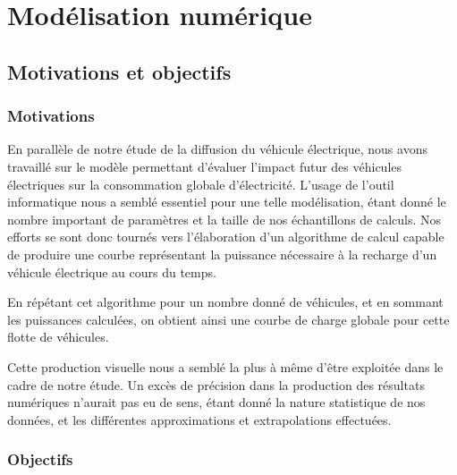 \lstset{ %
    language = c++, %
    basicstyle = \ttfamily%
}

\section{Modélisation numérique}
	\subsection{Motivations et objectifs}
		\subsubsection{Motivations}
			En parallèle de notre étude de la diffusion du véhicule électrique, nous avons travaillé sur le modèle permettant d'évaluer l'impact futur des véhicules électriques sur la consommation globale d'électricité. L'usage de l'outil informatique nous a semblé essentiel pour une telle modélisation, étant donné le nombre important de paramètres et la taille de nos échantillons de calculs. Nos efforts se sont donc tournés vers l'élaboration d'un algorithme de calcul capable de produire une courbe représentant la puissance nécessaire à la recharge d'un véhicule électrique au cours du temps.

			En répétant cet algorithme pour un nombre donné de véhicules, et en sommant les puissances calculées, on obtient ainsi une courbe de charge globale pour cette flotte de véhicules.

			Cette production visuelle nous a semblé la plus à même d'être exploitée dans le cadre de notre étude. Un excès de précision dans la production des résultats numériques n'aurait pas eu de sens, étant donné la nature statistique de nos données, et les différentes approximations et extrapolations effectuées.

		\subsubsection{Objectifs}
			
